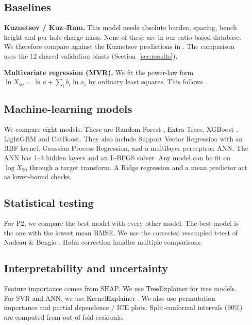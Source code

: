 \documentclass[conference]{IEEEtran}
\begin{document}
\subsection{Baselines}
\textbf{Kuznetsov / Kuz--Ram.} This model needs absolute burden, spacing, bench height and per-hole charge mass. None of these are in our ratio-based database. We therefore compare against the Kuznetsov predictions in \cite{kulatilake2010}. The comparison uses the 12 shared validation blasts (Section~\ref{sec:results}).

\textbf{Multivariate regression (MVR).} We fit the power-law form $\ln X_{50} = \ln a + \sum_i b_i \ln x_i$ by ordinary least squares. This follows \cite{hudaverdi2011,kulatilake2010}.

\subsection{Machine-learning models}
We compare eight models. These are Random Forest \cite{breiman2001}, Extra Trees, XGBoost \cite{chen2016xgboost}, LightGBM and CatBoost. They also include Support Vector Regression \cite{cortes1995svr} with an RBF kernel, Gaussian Process Regression, and a multilayer perceptron ANN. The ANN has 1--3 hidden layers and an L-BFGS solver. Any model can be fit on $\log X_{50}$ through a target transform. A Ridge regression and a mean predictor act as lower-bound checks.

\subsection{Statistical testing}
For P2, we compare the best model with every other model. The best model is the one with the lowest mean RMSE. We use the corrected resampled $t$-test of Nadeau \& Bengio \cite{nadeau2003}. Holm correction handles multiple comparisons.

\subsection{Interpretability and uncertainty}
Feature importance comes from SHAP. We use TreeExplainer for tree models. For SVR and ANN, we use KernelExplainer \cite{lundberg2017}. We also use permutation importance and partial dependence / ICE plots. Split-conformal intervals (90\%) are computed from out-of-fold residuals.
\end{document}
